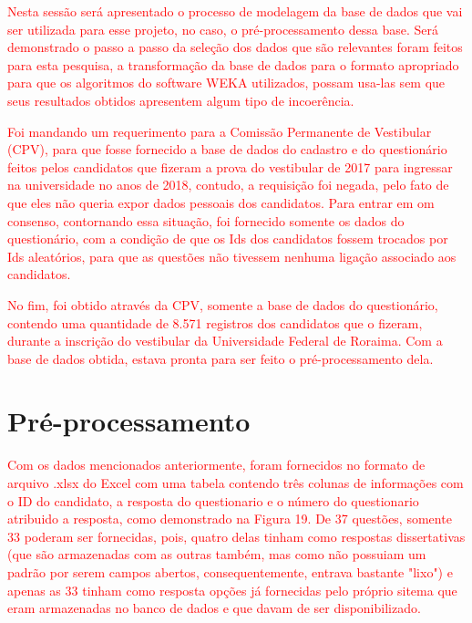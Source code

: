 \label{chapter:projeto}

\par
\textcolor{red}{Nesta sessão será apresentado o processo de modelagem da base de dados que vai ser utilizada para esse projeto, no caso, o pré-processamento dessa base. Será demonstrado o passo a passo da seleção dos dados que são relevantes foram feitos para esta pesquisa, a transformação da base de dados para o formato apropriado para que os algoritmos do software WEKA utilizados, possam usa-las sem que seus resultados obtidos apresentem algum tipo de incoerência.}

\par
\textcolor{red}{Foi mandando um requerimento para a Comissão Permanente de Vestibular (CPV), para que fosse fornecido a base de dados do cadastro e do questionário feitos pelos candidatos que fizeram a prova do vestibular de 2017 para ingressar na universidade no anos de 2018, contudo, a requisição foi negada, pelo fato de que eles não queria expor dados pessoais dos candidatos. Para entrar em om consenso, contornando essa situação, foi fornecido somente os dados do questionário, com a condição de que os Ids dos candidatos fossem trocados por Ids aleatórios, para que as questões não tivessem nenhuma ligação associado aos candidatos.}

\par
\textcolor{red}{No fim, foi obtido através da CPV, somente a base de dados do questionário, contendo uma quantidade de 8.571 registros dos candidatos que o fizeram, durante a inscrição do vestibular da Universidade Federal de Roraima. Com a base de dados obtida, estava pronta para ser feito o pré-processamento dela.}

\section{Pré-processamento}

\par
\textcolor{red}{Com os dados mencionados anteriormente, foram fornecidos no formato de arquivo .xlsx do Excel com uma tabela contendo três colunas de informações com o ID do candidato, a resposta do questionario e o número do questionario atribuido a resposta, como demonstrado na Figura 19. De 37 questões, somente 33 poderam ser fornecidas, pois, quatro delas tinham como respostas dissertativas (que são armazenadas com as outras também, mas como não possuiam um padrão por serem campos abertos, consequentemente, entrava bastante "lixo") e apenas as 33 tinham como resposta opções já fornecidas pelo próprio sitema que eram armazenadas no banco de dados e que davam de ser disponibilizado.}


